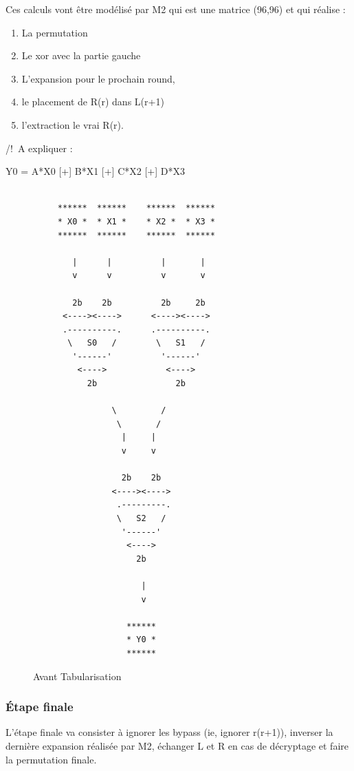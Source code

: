 \documentclass[a4paper,12pt]{article}
\begin{document}
Ces calculs vont être modélisé par M2 qui est une matrice (96,96) et qui réalise :
\begin{enumerate}
\item La permutation
\item Le xor avec la partie gauche
\item L'expansion pour le prochain round,
\item le placement de R(r) dans L(r+1) 
\item l'extraction le vrai R(r).
\end{enumerate}


/!\ A expliquer :

 Y0 = A*X0 [+] B*X1 [+] C*X2 [+] D*X3

\begin{figure}[h]
\begin{verbatim}

     ******  ******    ******  ******
     * X0 *  * X1 *    * X2 *  * X3 *
     ******  ******    ******  ******

        |      |          |       |
        v      v          v       v

        2b    2b          2b     2b
      <----><---->      <----><---->
      .----------.      .----------.
       \   S0   /        \   S1   /
        '------'          '------'
         <---->            <---->
           2b                2b

                \         /
                 \       /
                  |     |
                  v     v

                  2b    2b
                <----><---->
                 .---------.
                 \   S2   /
                  '------'
                   <---->
                     2b

                      |
                      v

                   ******
                   * Y0 *
                   ******

\end{verbatim}
\caption{Avant Tabularisation}
\label{fig:ascii-box}
\end{figure}	
\clearpage

\subsubsection{Étape finale}

L'étape finale va consister à ignorer les bypass (ie, ignorer r(r+1)), inverser la dernière expansion réalisée par M2, échanger L et R en cas de décryptage et faire la permutation finale.
\end{document}
